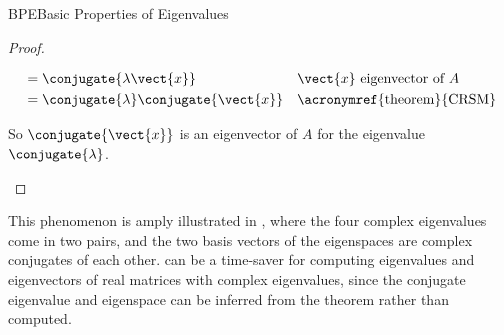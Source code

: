 \begin{subsect}{BPE}{Basic Properties of Eigenvalues}
\begin{proof}
\begin{para}
\begin{align*}
&=\conjugate{\lambda\vect{x}}&&\text{$\vect{x}$ eigenvector of $A$}\\
&=\conjugate{\lambda}\conjugate{\vect{x}}&&\text{\acronymref{theorem}{CRSM}}
\end{align*}
\end{para}
%
\begin{para}So $\conjugate{\vect{x}}$ is an eigenvector of $A$ for the eigenvalue $\conjugate{\lambda}$.\end{para}
%
\end{proof}
%
\begin{para}This phenomenon is amply illustrated in , where the four complex eigenvalues come in two pairs, and the two basis vectors of the eigenspaces are complex conjugates of each other.   can be a time-saver for computing eigenvalues and eigenvectors of real matrices with complex eigenvalues, since the conjugate eigenvalue and eigenspace can be inferred from the theorem rather than computed.\end{para}
%
\end{subsect}
%
